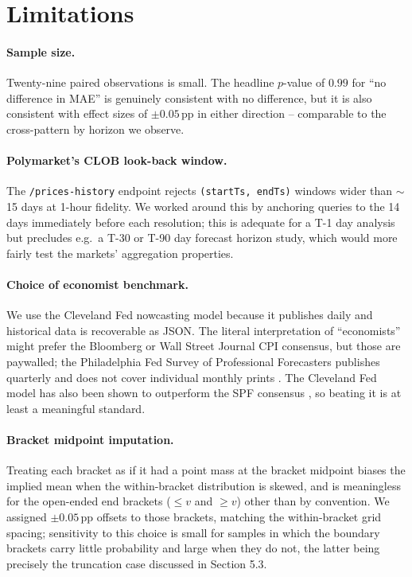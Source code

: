 \documentclass{article}
\begin{document}
\section{Limitations}

\paragraph{Sample size.}  Twenty-nine paired observations is small.
The headline $p$-value of $0.99$ for ``no difference in MAE'' is
genuinely consistent with no difference, but it is also consistent
with effect sizes of $\pm 0.05$\,pp in either direction -- comparable
to the cross-pattern by horizon we observe.

\paragraph{Polymarket's CLOB look-back window.}  The
\texttt{/prices-history} endpoint rejects \texttt{(startTs, endTs)}
windows wider than $\sim$15 days at 1-hour fidelity.  We worked around
this by anchoring queries to the 14 days immediately before each
resolution; this is adequate for a T-1 day analysis but precludes
e.g.\ a T-30 or T-90 day forecast horizon study, which would more
fairly test the markets' aggregation properties.

\paragraph{Choice of economist benchmark.}  We use the Cleveland Fed
nowcasting model because it publishes daily and historical data is
recoverable as JSON.  The literal interpretation of ``economists''
might prefer the Bloomberg or Wall Street Journal CPI consensus, but
those are paywalled; the Philadelphia Fed Survey of Professional
Forecasters publishes quarterly and does not cover individual monthly
prints \citep{croushore2001realtime}.  The Cleveland Fed model has
also been shown to outperform the SPF consensus
\citep{knotek2017nowcasting}, so beating it is at least a meaningful
standard.

\paragraph{Bracket midpoint imputation.}  Treating each bracket as if
it had a point mass at the bracket midpoint biases the implied mean
when the within-bracket distribution is skewed, and is meaningless for
the open-ended end brackets ($\le v$ and $\ge v$) other than by
convention.  We assigned $\pm 0.05$\,pp offsets to those brackets,
matching the within-bracket grid spacing; sensitivity to this choice
is small for samples in which the boundary brackets carry little
probability and large when they do not, the latter being precisely the
truncation case discussed in Section 5.3.
\end{document}
